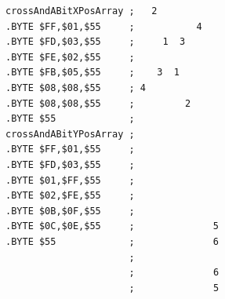 \begin{minipage}[b]{0.48\linewidth}
\vspace{0.5cm}
\begin{lrbox}{\mybox}%
\begin{lstlisting}[basicstyle=\ttfamily\tiny,escapechar=\%]
crossAndABitXPosArray ;   2           
.BYTE $FF,$01,$55     ;           4   
.BYTE $FD,$03,$55     ;     1  3      
.BYTE $FE,$02,$55     ;               
.BYTE $FB,$05,$55     ;    3  1       
.BYTE $08,$08,$55     ; 4             
.BYTE $08,$08,$55     ;         2     
.BYTE $55             ;               
crossAndABitYPosArray ;               
.BYTE $FF,$01,$55     ;               
.BYTE $FD,$03,$55     ;               
.BYTE $01,$FF,$55     ;               
.BYTE $02,$FE,$55     ;               
.BYTE $0B,$0F,$55     ;               
.BYTE $0C,$0E,$55     ;              5
.BYTE $55             ;              6
                      ;               
                      ;              6
                      ;              5
\end{lstlisting}
\end{lrbox}%
\scalebox{0.8}{\usebox{\mybox}}

\end{minipage}
%
